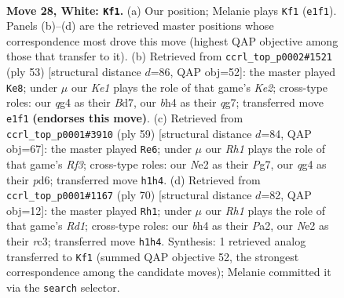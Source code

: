 \documentclass[11pt]{article}
\begin{document}
\clearpage

\begin{figure}[p]\centering
\begin{subfigure}{0.46\textwidth}\centering
\resizebox{\linewidth}{!}{%
\newchessgame
\chessboard[
  setfen={2Q5/pp1n2kp/7p/1P6/3P2qb/3r4/4N1B1/R3K2R w - - 2 28},
  showmover=false,
  pgfstyle=straightmove, color=movearrow, markmove={e1-f1}
]}
\caption{}
\end{subfigure}\hfill
\begin{subfigure}{0.46\textwidth}\centering
\resizebox{\linewidth}{!}{%
\newchessgame
\chessboard[
  setfen={8/p2bk1Q1/1np2rp1/4q1N1/8/7P/PP3PP1/3R2K1 b - - 3 27},
  showmover=false,
  pgfstyle=straightmove, color=movearrow, markmove={e7-e8}
]}
\caption{}
\end{subfigure}
\\[4pt]
\begin{subfigure}{0.46\textwidth}\centering
\resizebox{\linewidth}{!}{%
\newchessgame
\chessboard[
  setfen={r7/5kp1/p2P1r2/3Q3p/8/7P/PP1B1P1K/3q4 b - - 5 30},
  showmover=false,
  pgfstyle=straightmove, color=movearrow, markmove={f6-e6}
]}
\caption{}
\end{subfigure}\hfill
\begin{subfigure}{0.46\textwidth}\centering
\resizebox{\linewidth}{!}{%
\newchessgame
\chessboard[
  setfen={5k2/pp1Qnp2/3b2p1/8/4B3/2r1P3/PP2q3/1K1R4 w - - 0 36},
  showmover=false,
  pgfstyle=straightmove, color=movearrow, markmove={d1-h1}
]}
\caption{}
\end{subfigure}
\caption{\textbf{Move 28, White: \texttt{Kf1}.} (a) Our position; Melanie plays \texttt{Kf1} (\texttt{e1f1}). Panels (b)--(d) are the retrieved master positions whose correspondence most drove this move (highest QAP objective among those that transfer to it). (b) Retrieved from \texttt{ccrl\_top\_p0002\#1521} (ply 53) [structural distance $d$=86, QAP obj=52]: the master played \texttt{Ke8}; under $\mu$ our \emph{Ke1} plays the role of that game's \emph{Ke2}; cross-type roles: our \emph{q}g4 as their \emph{B}d7, our \emph{b}h4 as their \emph{q}g7; transferred move \texttt{e1f1} \textbf{(endorses this move)}. (c) Retrieved from \texttt{ccrl\_top\_p0001\#3910} (ply 59) [structural distance $d$=84, QAP obj=67]: the master played \texttt{Re6}; under $\mu$ our \emph{Rh1} plays the role of that game's \emph{Rf3}; cross-type roles: our \emph{N}e2 as their \emph{P}g7, our \emph{q}g4 as their \emph{p}d6; transferred move \texttt{h1h4}. (d) Retrieved from \texttt{ccrl\_top\_p0001\#1167} (ply 70) [structural distance $d$=82, QAP obj=12]: the master played \texttt{Rh1}; under $\mu$ our \emph{Rh1} plays the role of that game's \emph{Rd1}; cross-type roles: our \emph{b}h4 as their \emph{P}a2, our \emph{N}e2 as their \emph{r}c3; transferred move \texttt{h1h4}. Synthesis: 1 retrieved analog transferred to \texttt{Kf1} (summed QAP objective 52, the strongest correspondence among the candidate moves); Melanie committed it via the \texttt{search} selector.}
\label{fig:thought-m54}
\end{figure}
\end{document}
